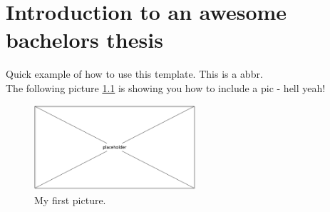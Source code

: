 
\chapter{Introduction to an awesome bachelors thesis}
Quick example of how to use this template. This is a \ac{abbr}. \\

The following picture \ref{pic} is showing you how to include a pic - hell yeah! 

\begin{figure}[!ht]
\centering
	\includegraphics[width=6cm]{placeholder.png} 	
\caption{My first picture.}
\label{pic}
\end{figure}

  


